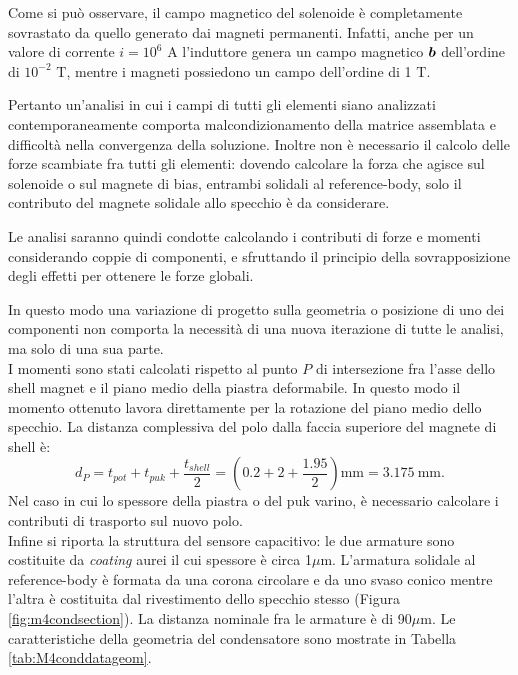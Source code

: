 Come si può osservare, il campo magnetico del solenoide è completamente sovrastato da quello generato dai magneti permanenti. Infatti, anche per un valore di corrente $i = 10^6$ A l'induttore genera un campo magnetico $\boldsymbol{b}$ dell'ordine di $10^{-2}$ T, mentre i magneti possiedono un campo dell'ordine di 1 T. 

Pertanto un'analisi in cui i campi di tutti gli elementi siano analizzati contemporaneamente comporta malcondizionamento della matrice assemblata e difficoltà nella convergenza della soluzione. Inoltre non è necessario il calcolo delle forze scambiate fra tutti gli elementi: dovendo calcolare la forza che agisce sul solenoide o sul magnete di bias, entrambi solidali al reference-body, solo il contributo del magnete solidale allo specchio è da considerare.

Le analisi saranno quindi condotte calcolando i contributi di forze e momenti considerando coppie di componenti, e sfruttando il principio della sovrapposizione degli effetti per ottenere le forze globali.

In questo modo una variazione di progetto sulla geometria o posizione di uno dei componenti non comporta la necessità di una nuova iterazione di tutte le analisi, ma solo di una sua parte.\\

I momenti sono stati calcolati rispetto al punto $P$ di intersezione fra l'asse dello shell magnet e il piano medio della piastra deformabile. In questo modo il momento ottenuto lavora direttamente per la rotazione del piano medio dello specchio. La distanza complessiva del polo dalla faccia superiore del magnete di shell è:
\begin{equation}
\label{eq:6polo}
d_P = t_{pot}+t_{puk}+\frac{t_{shell}}{2} = \left(0.2+2+\frac{1.95}{2}\right)\text{mm} = 3.175~\text{mm}.
\end{equation}
Nel caso in cui lo spessore della piastra o del puk varino, è necessario calcolare i contributi di trasporto sul nuovo polo.\\

Infine si riporta la struttura del sensore capacitivo: le due armature sono costituite da \textit{coating} aurei il cui spessore è circa 1$\mu$m. L'armatura solidale al reference-body è formata da una corona circolare e da uno svaso conico mentre l'altra è costituita dal rivestimento dello specchio stesso (Figura \ref{fig:m4condsection}). La distanza nominale fra le armature è di 90$\mu$m. Le caratteristiche della geometria del condensatore sono mostrate in Tabella \ref{tab:M4conddatageom}.

